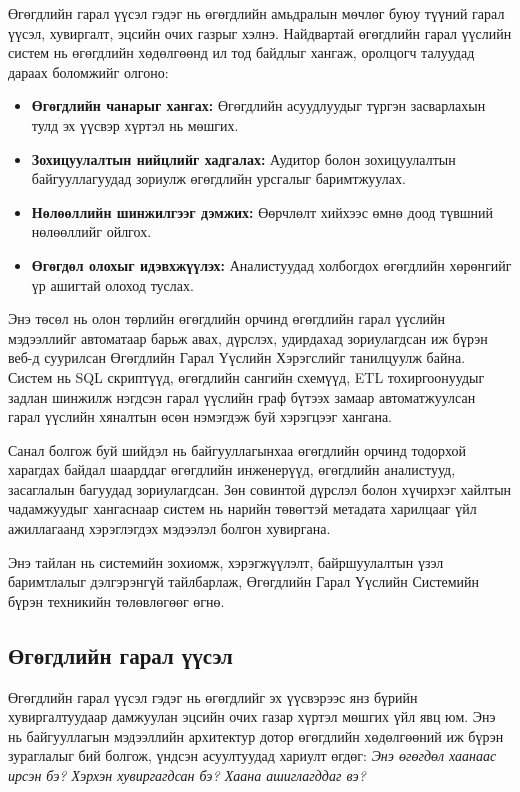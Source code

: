 Өгөгдлийн гарал үүсэл гэдэг нь өгөгдлийн амьдралын мөчлөг буюу түүний гарал үүсэл, хувиргалт, эцсийн очих газрыг хэлнэ. Найдвартай өгөгдлийн гарал үүслийн систем нь өгөгдлийн хөдөлгөөнд ил тод байдлыг хангаж, оролцогч талуудад дараах боломжийг олгоно:

\begin{itemize}
    \item \textbf{Өгөгдлийн чанарыг хангах:} Өгөгдлийн асуудлуудыг түргэн засварлахын тулд эх үүсвэр хүртэл нь мөшгих.
    \item \textbf{Зохицуулалтын нийцлийг хадгалах:} Аудитор болон зохицуулалтын байгууллагуудад зориулж өгөгдлийн урсгалыг баримтжуулах.
    \item \textbf{Нөлөөллийн шинжилгээг дэмжих:} Өөрчлөлт хийхээс өмнө доод түвшний нөлөөллийг ойлгох.
    \item \textbf{Өгөгдөл олохыг идэвхжүүлэх:} Аналистуудад холбогдох өгөгдлийн хөрөнгийг үр ашигтай олоход туслах.
\end{itemize}

Энэ төсөл нь олон төрлийн өгөгдлийн орчинд өгөгдлийн гарал үүслийн мэдээллийг автоматаар барьж авах, дүрслэх, удирдахад зориулагдсан иж бүрэн веб-д суурилсан Өгөгдлийн Гарал Үүслийн Хэрэгслийг танилцуулж байна. Систем нь SQL скриптүүд, өгөгдлийн сангийн схемүүд, ETL тохиргоонуудыг задлан шинжилж нэгдсэн гарал үүслийн граф бүтээх замаар автоматжуулсан гарал үүслийн хяналтын өсөн нэмэгдэж буй хэрэгцээг хангана.

Санал болгож буй шийдэл нь байгууллагынхаа өгөгдлийн орчинд тодорхой харагдах байдал шаарддаг өгөгдлийн инженерүүд, өгөгдлийн аналистууд, засаглалын багуудад зориулагдсан. Зөн совинтой дүрслэл болон хүчирхэг хайлтын чадамжуудыг хангаснаар систем нь нарийн төвөгтэй метадата харилцааг үйл ажиллагаанд хэрэглэгдэх мэдээлэл болгон хувиргана.

Энэ тайлан нь системийн зохиомж, хэрэгжүүлэлт, байршуулалтын үзэл баримтлалыг дэлгэрэнгүй тайлбарлаж, Өгөгдлийн Гарал Үүслийн Системийн бүрэн техникийн төлөвлөгөөг өгнө.

\subsection{Өгөгдлийн гарал үүсэл}
\label{subsec:data_lineage_concept}

Өгөгдлийн гарал үүсэл гэдэг нь өгөгдлийг эх үүсвэрээс янз бүрийн хувиргалтуудаар дамжуулан эцсийн очих газар хүртэл мөшгих үйл явц юм. Энэ нь байгууллагын мэдээллийн архитектур дотор өгөгдлийн хөдөлгөөний иж бүрэн зураглалыг бий болгож, үндсэн асуултуудад хариулт өгдөг: \textit{Энэ өгөгдөл хаанаас ирсэн бэ? Хэрхэн хувиргагдсан бэ? Хаана ашиглагддаг вэ?}

